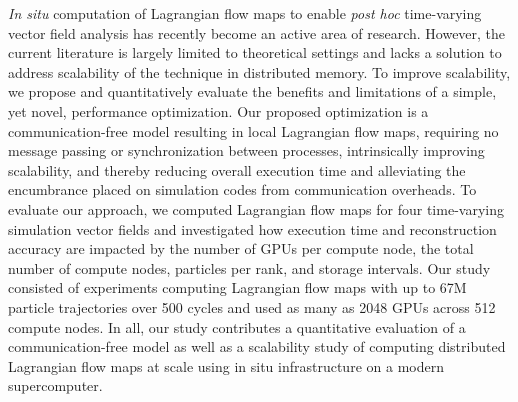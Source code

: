 \textit{In situ} computation of Lagrangian flow maps to enable \textit{post hoc} time-varying vector field analysis has recently become an active area of research. 
%
However, the current literature is largely limited to theoretical settings and lacks a solution to address scalability of the technique in distributed memory.
%
To improve scalability, we propose and quantitatively evaluate the benefits and limitations of a simple, yet novel, performance optimization.
%
Our proposed optimization is a communication-free model resulting in local Lagrangian flow maps, requiring no message passing or synchronization between processes, intrinsically improving scalability, and thereby reducing overall execution time and alleviating the encumbrance placed on simulation codes from communication overheads.
%
To evaluate our approach, we computed Lagrangian flow maps for four time-varying simulation vector fields and investigated how execution time and reconstruction accuracy are impacted by the number of GPUs per compute node, the total number of compute nodes, particles per rank, and storage intervals. 
%
Our study consisted of experiments computing Lagrangian flow maps with up to 67M particle trajectories over 500 cycles and used as many as 2048 GPUs across 512 compute nodes.
%
In all, our study contributes a quantitative evaluation of a communication-free model as well as a scalability study of computing distributed Lagrangian flow maps at scale using in situ infrastructure on a modern supercomputer.
%
